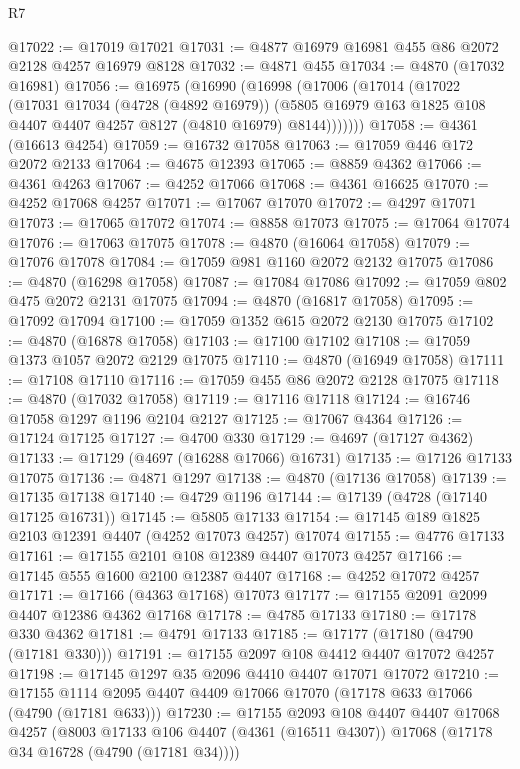 \begin{lexlean}{R7}
\begin{coremodule}
@17022 := @17019 @17021
@17031 := @4877 @16979 @16981 @455 @86 @2072 @2128 @4257 @16979 @8128
@17032 := @4871 @455
@17034 := @4870 (@17032 @16981)
@17056 := @16975
    (@16990
      (@16998
        (@17006
          (@17014
            (@17022
              (@17031
                @17034
                (@4728 (@4892 @16979))
                (@5805 @16979 @163 @1825 @108 @4407 @4407 @4257 @8127 (@4810 @16979) @8144)))))))
@17058 := @4361 (@16613 @4254)
@17059 := @16732 @17058
@17063 := @17059 @446 @172 @2072 @2133
@17064 := @4675 @12393
@17065 := @8859 @4362
@17066 := @4361 @4263
@17067 := @4252 @17066
@17068 := @4361 @16625
@17070 := @4252 @17068 @4257
@17071 := @17067 @17070
@17072 := @4297 @17071
@17073 := @17065 @17072
@17074 := @8858 @17073
@17075 := @17064 @17074
@17076 := @17063 @17075
@17078 := @4870 (@16064 @17058)
@17079 := @17076 @17078
@17084 := @17059 @981 @1160 @2072 @2132 @17075
@17086 := @4870 (@16298 @17058)
@17087 := @17084 @17086
@17092 := @17059 @802 @475 @2072 @2131 @17075
@17094 := @4870 (@16817 @17058)
@17095 := @17092 @17094
@17100 := @17059 @1352 @615 @2072 @2130 @17075
@17102 := @4870 (@16878 @17058)
@17103 := @17100 @17102
@17108 := @17059 @1373 @1057 @2072 @2129 @17075
@17110 := @4870 (@16949 @17058)
@17111 := @17108 @17110
@17116 := @17059 @455 @86 @2072 @2128 @17075
@17118 := @4870 (@17032 @17058)
@17119 := @17116 @17118
@17124 := @16746 @17058 @1297 @1196 @2104 @2127
@17125 := @17067 @4364
@17126 := @17124 @17125
@17127 := @4700 @330
@17129 := @4697 (@17127 @4362)
@17133 := @17129 (@4697 (@16288 @17066) @16731)
@17135 := @17126 @17133 @17075
@17136 := @4871 @1297
@17138 := @4870 (@17136 @17058)
@17139 := @17135 @17138
@17140 := @4729 @1196
@17144 := @17139 (@4728 (@17140 @17125 @16731))
@17145 := @5805 @17133
@17154 := @17145 @189 @1825 @2103 @12391 @4407 (@4252 @17073 @4257) @17074
@17155 := @4776 @17133
@17161 := @17155 @2101 @108 @12389 @4407 @17073 @4257
@17166 := @17145 @555 @1600 @2100 @12387 @4407
@17168 := @4252 @17072 @4257
@17171 := @17166 (@4363 @17168) @17073
@17177 := @17155 @2091 @2099 @4407 @12386 @4362 @17168
@17178 := @4785 @17133
@17180 := @17178 @330 @4362
@17181 := @4791 @17133
@17185 := @17177 (@17180 (@4790 (@17181 @330)))
@17191 := @17155 @2097 @108 @4412 @4407 @17072 @4257
@17198 := @17145 @1297 @35 @2096 @4410 @4407 @17071 @17072
@17210 := @17155 @1114 @2095 @4407 @4409 @17066 @17070 (@17178 @633 @17066 (@4790 (@17181 @633)))
@17230 := @17155
    @2093
    @108
    @4407
    @4407
    @17068
    @4257
    (@8003 @17133 @106 @4407 (@4361 (@16511 @4307)) @17068 (@17178 @34 @16728 (@4790 (@17181 @34))))

\end{coremodule}
\end{lexlean}
